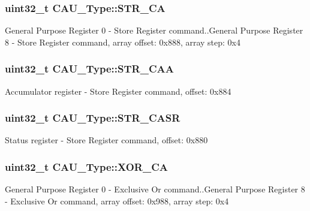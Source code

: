 \subsubsection[{\texorpdfstring{S\+T\+R\+\_\+\+CA}{STR_CA}}]{ uint32\+\_\+t C\+A\+U\+\_\+\+Type\+::\+S\+T\+R\+\_\+\+CA}\hypertarget{structCAU__Type_a267a36493b82b59a769d9b7bcad8584c}{}\label{structCAU__Type_a267a36493b82b59a769d9b7bcad8584c}
General Purpose Register 0 -\/ Store Register command..General Purpose Register 8 -\/ Store Register command, array offset\+: 0x888, array step\+: 0x4 
\subsubsection[{\texorpdfstring{S\+T\+R\+\_\+\+C\+AA}{STR_CAA}}]{ uint32\+\_\+t C\+A\+U\+\_\+\+Type\+::\+S\+T\+R\+\_\+\+C\+AA}\hypertarget{structCAU__Type_a72320359f6a82e0083f25af7bdb09659}{}\label{structCAU__Type_a72320359f6a82e0083f25af7bdb09659}
Accumulator register -\/ Store Register command, offset\+: 0x884 
\subsubsection[{\texorpdfstring{S\+T\+R\+\_\+\+C\+A\+SR}{STR_CASR}}]{ uint32\+\_\+t C\+A\+U\+\_\+\+Type\+::\+S\+T\+R\+\_\+\+C\+A\+SR}\hypertarget{structCAU__Type_a475b305a546c5aaae9a05fd9cb448815}{}\label{structCAU__Type_a475b305a546c5aaae9a05fd9cb448815}
Status register -\/ Store Register command, offset\+: 0x880 
\subsubsection[{\texorpdfstring{X\+O\+R\+\_\+\+CA}{XOR_CA}}]{ uint32\+\_\+t C\+A\+U\+\_\+\+Type\+::\+X\+O\+R\+\_\+\+CA}\hypertarget{structCAU__Type_a3b7e24bc3fc967d60bfe4aa9724af545}{}\label{structCAU__Type_a3b7e24bc3fc967d60bfe4aa9724af545}
General Purpose Register 0 -\/ Exclusive Or command..General Purpose Register 8 -\/ Exclusive Or command, array offset\+: 0x988, array step\+: 0x4 
